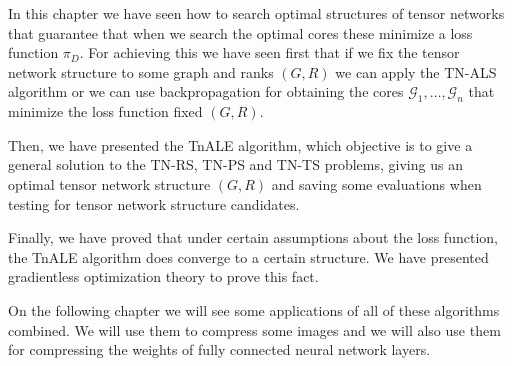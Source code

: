 \documentclass[11pt,a4paper,openright,oneside]{book}
\numberwithin{equation}{section}
\newcommand{\refeq}[1]{\cref{#1}}
\DeclareMathOperator{\TNS}{TNS}
\begin{document}
{In this chapter we have seen how to search optimal structures of tensor networks that guarantee that
when we search the optimal cores these minimize a loss function $\pi_D$. For achieving this we have
seen first that if we fix the tensor network structure to some graph and ranks $(G, R)$ we can 
apply the TN-ALS algorithm or we can use backpropagation for obtaining the cores
$\mathcal{G}_1, \dots, \mathcal{G}_n$ that minimize the loss function fixed $(G, R)$.

Then, we have presented the TnALE algorithm, which objective is to give a general solution to the
TN-RS, TN-PS and TN-TS problems, giving us an optimal tensor network structure $(G, R)$ and saving
some evaluations when testing for tensor network structure candidates.

Finally, we have proved that under certain assumptions about the loss function, the TnALE algorithm
does converge to a certain structure. We have presented gradientless optimization theory to prove this fact.

On the following chapter we will see some applications of all of these algorithms combined. We will use them
to compress some images and we will also use them for compressing the weights of fully connected neural network layers.

}
\end{document}
